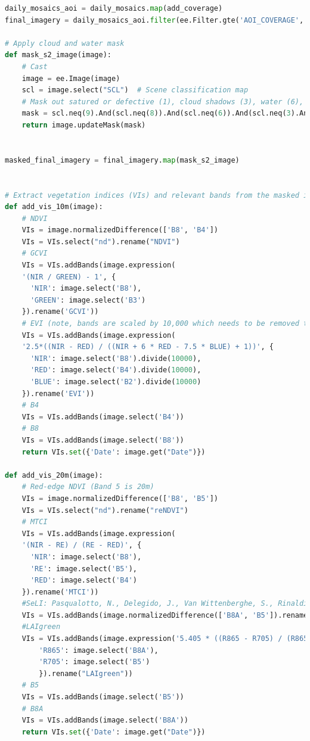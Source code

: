 \documentclass{article}
\begin{document}
\begin{lstlisting}[language=Python]
daily_mosaics_aoi = daily_mosaics.map(add_coverage)
final_imagery = daily_mosaics_aoi.filter(ee.Filter.gte('AOI_COVERAGE', min_aoi_coverage))

# Apply cloud and water mask
def mask_s2_image(image):
    # Cast
    image = ee.Image(image)
    scl = image.select("SCL")  # Scene classification map
    # Mask out satured or defective (1), cloud shadows (3), water (6), clouds medium prop (8), clouds high prob (9)
    mask = scl.neq(9).And(scl.neq(8)).And(scl.neq(6)).And(scl.neq(3).And(scl.neq(1)))
    return image.updateMask(mask)

    
masked_final_imagery = final_imagery.map(mask_s2_image)


# Extract vegetation indices (VIs) and relevant bands from the masked imagery, use separate functions for VIs that only use 10m imagery vs ones that use 20m 
def add_vis_10m(image):
    # NDVI 
    VIs = image.normalizedDifference(['B8', 'B4'])
    VIs = VIs.select("nd").rename("NDVI")
    # GCVI
    VIs = VIs.addBands(image.expression(
    '(NIR / GREEN) - 1', {
      'NIR': image.select('B8'),
      'GREEN': image.select('B3')
    }).rename('GCVI'))
    # EVI (note, bands are scaled by 10,000 which needs to be removed to get surface reflectance values)
    VIs = VIs.addBands(image.expression(
    '2.5*((NIR - RED) / ((NIR + 6 * RED - 7.5 * BLUE) + 1))', {
      'NIR': image.select('B8').divide(10000),
      'RED': image.select('B4').divide(10000),
      'BLUE': image.select('B2').divide(10000)
    }).rename('EVI'))
    # B4
    VIs = VIs.addBands(image.select('B4'))
    # B8
    VIs = VIs.addBands(image.select('B8'))
    return VIs.set({'Date': image.get("Date")})

def add_vis_20m(image):
    # Red-edge NDVI (Band 5 is 20m)
    VIs = image.normalizedDifference(['B8', 'B5'])
    VIs = VIs.select("nd").rename("reNDVI")
    # MTCI
    VIs = VIs.addBands(image.expression(
    '(NIR - RE) / (RE - RED)', {
      'NIR': image.select('B8'),
      'RE': image.select('B5'),
      'RED': image.select('B4')
    }).rename('MTCI'))
    #SeLI: Pasqualotto, N., Delegido, J., Van Wittenberghe, S., Rinaldi, M., & Moreno, J. (2019). Multi-Crop Green LAI Estimation with a New Simple Sentinel-2 LAI Index (SeLI). Sensors (Basel, Switzerland), 19(4), 904. doi:10.3390/s19040904
    VIs = VIs.addBands(image.normalizedDifference(['B8A', 'B5']).rename('SeLI'))
    #LAIgreen 
    VIs = VIs.addBands(image.expression('5.405 * ((R865 - R705) / (R865 + R705)) - 0.114', {
        'R865': image.select('B8A'),
        'R705': image.select('B5')
        }).rename("LAIgreen"))
    # B5
    VIs = VIs.addBands(image.select('B5'))
    # B8A 
    VIs = VIs.addBands(image.select('B8A'))
    return VIs.set({'Date': image.get("Date")})


\end{lstlisting}
\end{document}
